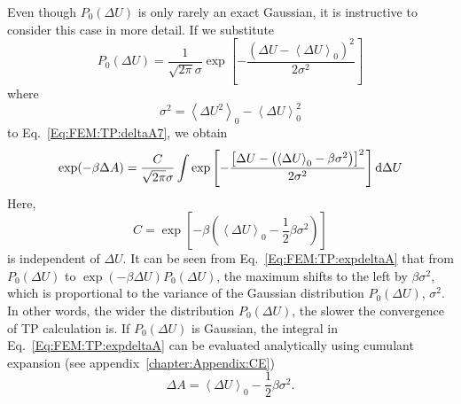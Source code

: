 Even though $P_{0}(\Delta U)$ is only rarely an exact Gaussian, it is instructive to consider this case in more detail. If we substitute
\begin{equation}
  P_{0}(\Delta U) = \frac{1}{\sqrt{2\pi}\sigma}\exp{\left[-\frac{(\Delta U - \left \langle \Delta U \right \rangle_{0})^2}{2\sigma^2}\right]}
  \label{Eq:FEM:TP:gaussian}
\end{equation}
where
\begin{equation}
  \sigma^2 = \left \langle \Delta U^2 \right \rangle_{0} - \left \langle \Delta U \right \rangle_{0}^2
  \label{Eq:FEM:TP:variance}
\end{equation}
to Eq.~\ref{Eq:FEM:TP:deltaA7}, we obtain
\begin{equation}
  \exp(-\beta \Delta A) = \frac{C}{\sqrt{2\pi}\sigma} \int \exp{\left[-\frac{\left[\Delta U - \left(\left \langle \Delta U \right \rangle_{0} - \beta \sigma ^2\right)\right]^2}{2\sigma^2}\right]} \mathop{}\!\mathrm{d}\Delta U
  \label{Eq:FEM:TP:expdeltaA}
\end{equation}
Here,
\begin{equation}
  C = \exp{\left[-\beta \left(\left \langle \Delta U \right \rangle_{0} - \frac{1}{2} \beta \sigma ^2\right)\right]}
  \label{Eq:FEM:TP:C}
\end{equation}
is independent of $\Delta U$. It can be seen from Eq.~\ref{Eq:FEM:TP:expdeltaA} that from $P_{0}(\Delta U)$ to $\exp{(-\beta \Delta U)}P_{0}(\Delta U)$, the maximum shifts to the left by $\beta \sigma ^2$, which is proportional to the variance of the Gaussian distribution $P_{0}(\Delta U)$, $\sigma^2$. In other words, the wider the distribution $P_{0}(\Delta U)$, the slower the convergence of TP calculation is. 
If $P_{0}(\Delta U)$ is Gaussian, the integral in Eq.~\ref{Eq:FEM:TP:expdeltaA} can be evaluated analytically using cumulant expansion (see appendix~\ref{chapter:Appendix:CE})
\begin{equation}
  \Delta A = \left< \Delta U \right>_{0} - \frac{1}{2} \beta \sigma ^2.
  \label{Eq:FEM:TP:deltaA8}
\end{equation}
